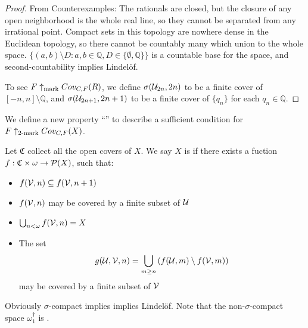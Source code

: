   \begin{proof}
  From Counterexamples: The rationals are closed, but the closure of any open neighborhood is the whole real line, so they cannot be separated from any irrational point. Compact sets in this topology are nowhere dense in the Euclidean topology, so there cannot be countably many which union to the whole space. $\{(a,b)\setminus D : a,b\in\mathbb{Q},D\in\{\emptyset,\mathbb{Q}\}\}$ is a countable base for the space, and second-countability implies Lindel\"of.


  To see $F \uparrow_{\text{mark}} Cov_{C,F}(R)$, we define $\sigma(\mathcal{U}_{2n},2n)$ to be a finite cover of $[-n,n]\setminus\mathbb{Q}$, and $\sigma(\mathcal{U}_{2n+1},2n+1)$ to be a finite cover of $\{q_n\}$ for each $q_n\in\mathbb{Q}$.
  \end{proof}

  We define a new property ``\scish'' to describe a sufficient condition for $F \uparrow_{2\text{-mark}}Cov_{C,F}(X)$.

  \begin{definition}
    Let $\mathfrak{C}$ collect all the open covers of $X$. We say $X$ is \scish if there exists a fuction $f:\mathfrak{C}\times\omega\to\mathcal{P}(X)$, such that:
      \begin{itemize}
        \item $f(\mathcal{V},n)\subseteq f(\mathcal{V},n+1)$
        \item $f(\mathcal{V},n)$ may be covered by a finite subset of $\mathcal{U}$
        \item $\bigcup_{n<\omega}f(\mathcal{V},n)=X$
        \item The set
          \[
            g(\mathcal{U},\mathcal{V},n) = \bigcup_{m\geq n}\left(f(\mathcal{U},m)\setminus f(\mathcal{V},m)\right)
          \]
         may be covered by a finite subset of $\mathcal{V}$
      \end{itemize}
  \end{definition}

  Obviously $\sigma$-compact implies \scish implies Lindel\"of. Note that the non-$\sigma$-compact space $\omega_1^\dagger$ is \scish.


